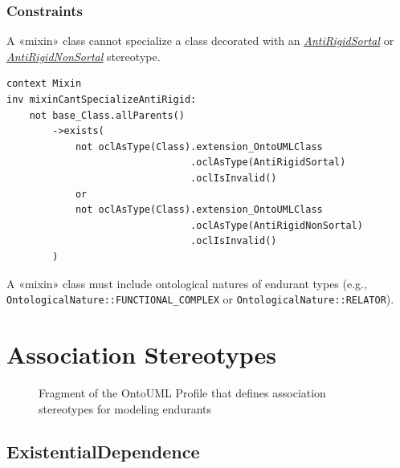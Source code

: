 \subsubsection{Constraints}

\begin{constraint}
\label{mixinCantSpecializeAntiRigid}
A «mixin» class cannot specialize a class decorated with an \hyperref[stereotype:antiRigidSortal]{\textit{AntiRigidSortal}} or \hyperref[stereotype:antiRigidNonSortal]{\textit{AntiRigidNonSortal}} stereotype.

\begin{lstlisting}[language=OCL]
context Mixin 
inv mixinCantSpecializeAntiRigid:
    not base_Class.allParents()
        ->exists(
            not oclAsType(Class).extension_OntoUMLClass
                                .oclAsType(AntiRigidSortal)
                                .oclIsInvalid() 
            or
            not oclAsType(Class).extension_OntoUMLClass
                                .oclAsType(AntiRigidNonSortal)
                                .oclIsInvalid()
        )
\end{lstlisting}
\end{constraint}

\begin{constraint}
\label{mixinHasToIncludeEndurantNatures}
A «mixin» class must include ontological natures of endurant types (e.g., \texttt{OntologicalNature::\-FUNCTIONAL\-\_COMPLEX} or \texttt{OntologicalNature::RELATOR}).

\end{constraint}




\FloatBarrier
\newpage
\section{Association Stereotypes}

\begin{figure}[h]
    \centering
    
    \caption{Fragment of the OntoUML Profile that defines association stereotypes for modeling endurants}
    \label{fig:endurant-associations-profile}
\end{figure}

\subsection{ExistentialDependence}
\label{stereotype:existential-dependence}

